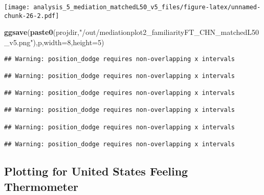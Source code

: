 \documentclass[
]{article}
\newenvironment{Shaded}{\begin{snugshade}}{\end{snugshade}}
\newcommand{\DataTypeTok}[1]{\textcolor[rgb]{0.13,0.29,0.53}{#1}}
\newcommand{\DecValTok}[1]{\textcolor[rgb]{0.00,0.00,0.81}{#1}}
\newcommand{\KeywordTok}[1]{\textcolor[rgb]{0.13,0.29,0.53}{\textbf{#1}}}
\newcommand{\NormalTok}[1]{#1}
\newcommand{\StringTok}[1]{\textcolor[rgb]{0.31,0.60,0.02}{#1}}
\begin{document}
\texttt{[image: analysis\_5\_mediation\_matchedL50\_v5\_files/figure-latex/unnamed-chunk-26-2.pdf]}

\begin{Shaded}
\begin{Highlighting}[]
\KeywordTok{ggsave}\NormalTok{(}\KeywordTok{paste0}\NormalTok{(projdir,}\StringTok{"/out/mediationplot2_familiarityFT_CHN_matchedL50_v5.png"}\NormalTok{),p,}\DataTypeTok{width=}\DecValTok{8}\NormalTok{,}\DataTypeTok{height=}\DecValTok{5}\NormalTok{)}
\end{Highlighting}
\end{Shaded}

\begin{verbatim}
## Warning: position_dodge requires non-overlapping x intervals

## Warning: position_dodge requires non-overlapping x intervals

## Warning: position_dodge requires non-overlapping x intervals

## Warning: position_dodge requires non-overlapping x intervals

## Warning: position_dodge requires non-overlapping x intervals

## Warning: position_dodge requires non-overlapping x intervals
\end{verbatim}

\hypertarget{plotting-for-united-states-feeling-thermometer}{%
\subsection{Plotting for United States Feeling
Thermometer}\label{plotting-for-united-states-feeling-thermometer}}
\end{document}
